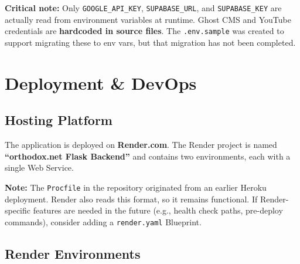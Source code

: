 \documentclass[12pt]{article}
\begin{document}
\textbf{Critical note:} Only \texttt{GOOGLE\_API\_KEY}, \texttt{SUPABASE\_URL}, and \texttt{SUPABASE\_KEY} are actually read from environment variables at runtime. Ghost CMS and YouTube credentials are \textbf{hardcoded in source files}. The \texttt{.env.sample} was created to support migrating these to env vars, but that migration has not been completed.

\section{Deployment \& DevOps}

\subsection{Hosting Platform}

The application is deployed on \textbf{Render.com}. The Render project is named \textbf{``orthodox.net Flask Backend''} and contains two environments, each with a single Web Service.

\textbf{Note:} The \texttt{Procfile} in the repository originated from an earlier Heroku deployment. Render also reads this format, so it remains functional. If Render-specific features are needed in the future (e.g., health check paths, pre-deploy commands), consider adding a \texttt{render.yaml} Blueprint.

\subsection{Render Environments}
\end{document}
